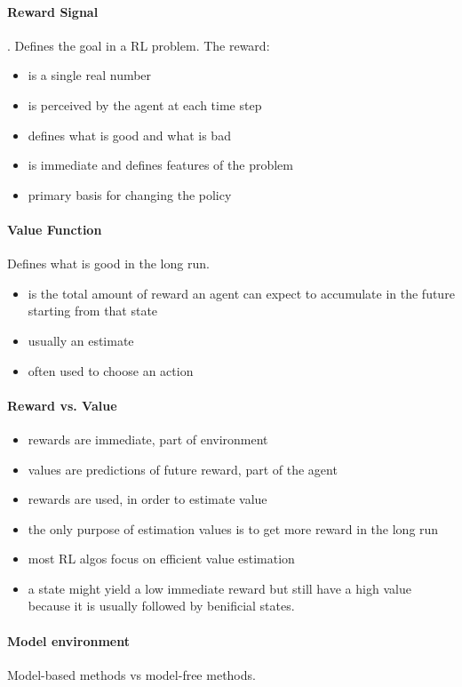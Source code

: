 \documentclass[10pt,a4paper]{article}
\begin{document}
\paragraph{Reward Signal}. Defines the goal in a RL problem. The reward:
\begin{itemize}
\item is a single real number
\item is perceived by the agent at each time step
\item defines what is good and what is bad
\item is immediate and defines features of the problem
\item primary basis for changing the policy
\end{itemize}

\paragraph{Value Function} Defines what is good in the long run. 
\begin{itemize}
\item is the total amount of reward an agent can expect to accumulate in the future starting from that state
\item usually an estimate
\item often used to choose an action
\end{itemize}

\paragraph{Reward vs. Value}
\begin{itemize}
\item rewards are immediate, part of environment
\item values are predictions of future reward, part of the agent
\item rewards are used, in order to estimate value
\item the only purpose of estimation values is to get more reward in the long run
\item most RL algos focus on efficient value estimation
\item a state might yield a low immediate reward but still have a high value because it is usually followed by benificial states.
\end{itemize}

\paragraph{Model environment}
Model-based methods vs model-free methods.
\end{document}
